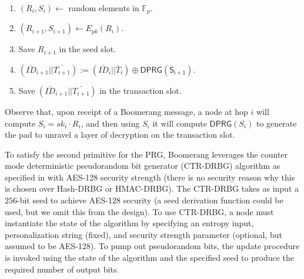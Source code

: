 \begin{enumerate}
	\item $(R_i,S_i) \gets $ random elements in $\mathbb{F}_p$.
	\item $(R_{i+1},S_{i+1}) \gets E_{pk}(R_i)$.
	\item Save $R_{i+1}$ in the seed slot.
	\item $(\bar{ID}_{i+1} || \bar{T_{i+1}}) := (\bar{ID}_i || \bar{T}_i) \oplus \mathsf{DPRG(S_{i+1})}$.
	\item Save $(\bar{ID}_{i+1} || \bar{T_{i+1}})$ in the transaction slot.
\end{enumerate}
Observe that, upon receipt of a Boomerang message, a node at hop $i$ will compute $S_i = sk_i \cdot R_i$, and then using $S_i$ it will compute $\mathsf{DPRG}(S_i)$ to generate the pad to unravel a layer of decryption on the transaction slot. 

To satisfy the second primitive for the PRG, Boomerang leverages the counter mode deterministic pseudorandom bit generator (CTR-DRBG) algorithm as specified in \cite{nist-prng} with AES-128 security strength (there is no security reason why this is chosen over Hash-DRBG or HMAC-DRBG). The CTR-DRBG takes as input a $256$-bit seed to achieve AES-128 security (a seed derivation function could be used, but we omit this from the design). To use CTR-DRBG, a node must instantiate the state of the algorithm by specifying an entropy input, personalization string (fixed), and security strength parameter (optional, but assumed to be AES-128). To pump out pseudorandom bits, the update procedure is invoked using the state of the algorithm and the specified seed to produce the required number of output bits.


